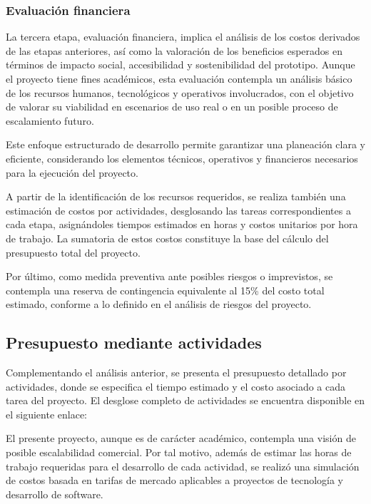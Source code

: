\subsubsection{Evaluación financiera}

La tercera etapa, evaluación financiera, implica el análisis de los costos derivados de las etapas anteriores, así como la valoración de los beneficios esperados en términos de impacto social, accesibilidad y sostenibilidad del prototipo. Aunque el proyecto tiene fines académicos, esta evaluación contempla un análisis básico de los recursos humanos, tecnológicos y operativos involucrados, con el objetivo de valorar su viabilidad en escenarios de uso real o en un posible proceso de escalamiento futuro.

Este enfoque estructurado de desarrollo permite garantizar una planeación clara y eficiente, considerando los elementos técnicos, operativos y financieros necesarios para la ejecución del proyecto.

A partir de la identificación de los recursos requeridos, se realiza también una estimación de costos por actividades, desglosando las tareas correspondientes a cada etapa, asignándoles tiempos estimados en horas y costos unitarios por hora de trabajo. La sumatoria de estos costos constituye la base del cálculo del presupuesto total del proyecto.

Por último, como medida preventiva ante posibles riesgos o imprevistos, se contempla una reserva de contingencia equivalente al 15\% del costo total estimado, conforme a lo definido en el análisis de riesgos del proyecto.

\subsection{Presupuesto mediante actividades}

Complementando el análisis anterior, se presenta el presupuesto detallado por actividades, donde se especifica el tiempo estimado y el costo asociado a cada tarea del proyecto. El desglose completo de actividades se encuentra disponible en el siguiente enlace:

El presente proyecto, aunque es de carácter académico, contempla una visión de posible escalabilidad comercial. Por tal motivo, además de estimar las horas de trabajo requeridas para el desarrollo de cada actividad, se realizó una simulación de costos basada en tarifas de mercado aplicables a proyectos de tecnología y desarrollo de software. 

